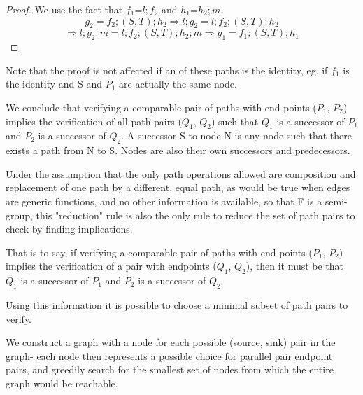 \documentclass{article}
\begin{document}

\begin{proof}
We use the fact that $f_1$=$l; f_2$ and $h_1$=$h_2; m$.
\[g_2 = f_2; (S,T); h_2 \Rightarrow l; g_2 = l; f_2; (S,T) ; h_2 \]
\[\Rightarrow l ; g_2 ; m = l ; f_2 ; (S,T) ; h_2 ; m \Rightarrow g_1 = f_1 ; (S,T) ; h_1\]
\end{proof}

Note that the proof is not affected if an of these paths is the identity, eg. if $f_1$ is the identity and S and $P_1$ are actually the same node.

We conclude that verifying a comparable pair of paths with end points ($P_1$, $P_2$) implies the verification of all path pairs ($Q_1$, $Q_2$) such that $Q_1$ is a successor of $P_1$ and $P_2$ is a successor of $Q_2$. A successor S to node N is any node such that there exists a path from N to S. Nodes are also their own successors and predecessors.

Under the assumption that the only path operations allowed are composition and replacement of one path by a different, equal path, as would be true when edges are generic functions, and no other information is available, so that F is a semi-group, this "reduction" rule is also the only rule to reduce the set of path pairs to check by finding implications.

That is to say, if verifying a comparable pair of paths with end points ($P_1$, $P_2$) implies the verification of a pair with endpoints ($Q_1$, $Q_2$), then it must be that $Q_1$ is a successor of $P_1$ and $P_2$ is a successor of $Q_2$. %

Using this information it is possible to choose a minimal subset of path pairs to verify.

We construct a graph with a node for each possible (source, sink) pair in the graph- each node then represents a possible choice for parallel pair endpoint pairs, and greedily search for the smallest set of nodes from which the entire graph would be reachable.
\end{document}
